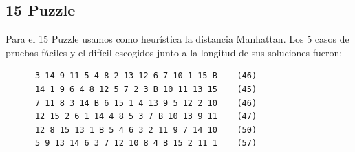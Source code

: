 \documentclass[a4paper,10pt]{article}
\begin{document}
  \subsection{15 Puzzle}
    Para el 15 Puzzle usamos como heur\'istica la distancia Manhattan. Los
    5 casos de pruebas f\'aciles y el dif\'icil escogidos junto a la longitud de sus 
    soluciones fueron:
    
    \begin{verbatim}
      3 14 9 11 5 4 8 2 13 12 6 7 10 1 15 B    (46)
      14 1 9 6 4 8 12 5 7 2 3 B 10 11 13 15    (45)
      7 11 8 3 14 B 6 15 1 4 13 9 5 12 2 10    (46)
      12 15 2 6 1 14 4 8 5 3 7 B 10 13 9 11    (47)
      12 8 15 13 1 B 5 4 6 3 2 11 9 7 14 10    (50)
      5 9 13 14 6 3 7 12 10 8 4 B 15 2 11 1    (57)
    \end{verbatim}
    
\end{document}
